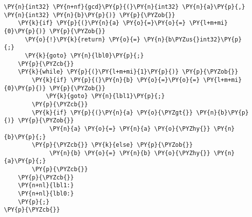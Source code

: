 \begin{Verbatim}[commandchars=\\\{\}]
\PY{n}{int32} \PY{n+nf}{gcd}\PY{p}{(}\PY{n}{int32} \PY{n}{a}\PY{p}{,} \PY{n}{int32} \PY{n}{b}\PY{p}{)} \PY{p}{\PYZob{}}
    \PY{k}{if} \PY{p}{(}\PY{n}{a} \PY{o}{=}\PY{o}{=} \PY{l+m+mi}{0}\PY{p}{)} \PY{p}{\PYZob{}}
      \PY{o}{!}\PY{k}{return} \PY{o}{=} \PY{n}{b\PYZus{}int32}\PY{p}{;}
      \PY{k}{goto} \PY{n}{lbl0}\PY{p}{;}
    \PY{p}{\PYZcb{}}
    \PY{k}{while} \PY{p}{(}\PY{l+m+mi}{1}\PY{p}{)} \PY{p}{\PYZob{}}
        \PY{k}{if} \PY{p}{(}\PY{n}{b} \PY{o}{=}\PY{o}{=} \PY{l+m+mi}{0}\PY{p}{)} \PY{p}{\PYZob{}}
            \PY{k}{goto} \PY{n}{lbl1}\PY{p}{;}
        \PY{p}{\PYZcb{}}
        \PY{k}{if} \PY{p}{(}\PY{n}{a} \PY{o}{\PYZgt{}} \PY{n}{b}\PY{p}{)} \PY{p}{\PYZob{}}
             \PY{n}{a} \PY{o}{=} \PY{n}{a} \PY{o}{\PYZhy{}} \PY{n}{b}\PY{p}{;}
        \PY{p}{\PYZcb{}} \PY{k}{else} \PY{p}{\PYZob{}}
             \PY{n}{b} \PY{o}{=} \PY{n}{b} \PY{o}{\PYZhy{}} \PY{n}{a}\PY{p}{;}
        \PY{p}{\PYZcb{}}
    \PY{p}{\PYZcb{}}
    \PY{n+nl}{lbl1:}
    \PY{n+nl}{lbl0:}
    \PY{p}{;}
\PY{p}{\PYZcb{}}
\end{Verbatim}
